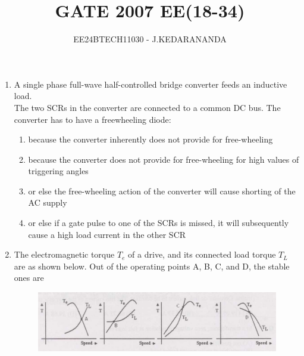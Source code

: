 \documentclass[journal]{IEEEtran}
\renewcommand{\thefigure}{\theenumi}
\renewcommand{\thetable}{\theenumi}
\numberwithin{equation}{enumi}
\numberwithin{figure}{enumi}
\renewcommand{\thetable}{\theenumi}
\begin{document}

\vspace{3cm}

\title{GATE 2007 EE(18-34)}
\author{EE24BTECH11030 - J.KEDARANANDA}
{\let\newpage\relax\maketitle}
\renewcommand{\thefigure}{\theenumi}
\renewcommand{\thetable}{\theenumi}
\begin{enumerate}
    \item A single phase full-wave half-controlled bridge converter feeds an inductive load. \\The two SCRs in the converter are connected to a common DC bus. The converter has to have a freewheeling diode:
    \begin{enumerate}
        \item  because the converter inherently does not provide for free-wheeling
        \item  because the converter does not provide for free-wheeling for high values of triggering angles
        \item  or else the free-wheeling action of the converter will cause shorting of the AC supply
        \item  or else if a gate pulse to one of the SCRs is missed, it will subsequently cause a high load current in the other SCR
    \end{enumerate}
    \bigskip
    \item The electromagnetic torque $T_e$ of a drive, and its connected load torque $T_L$ are as shown below. Out of the operating points A, B, C, and D, the stable ones are
    \begin{figure}[!ht]
    \centering
    \includegraphics[width=\linewidth]{figs/2.png}
    \caption{}
    \end{figure}
\begin{multicols}{4}
\begin{enumerate}

\end{enumerate}
\end{multicols}
\end{enumerate}
\end{document}
